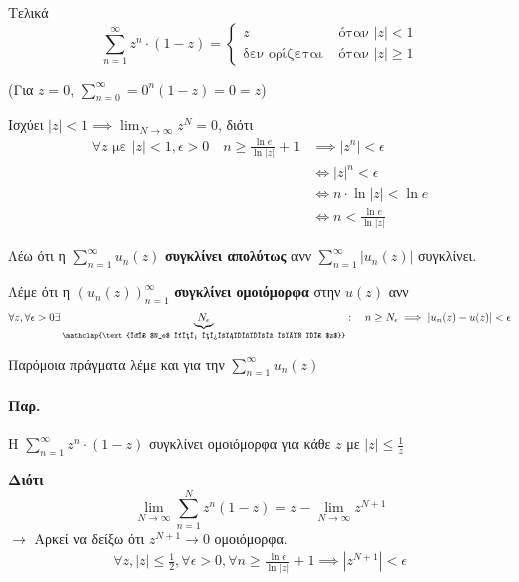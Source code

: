 \documentclass[12pt,a4paper,notitlepage,fleqn]{article}
\begin{document}
     Τελικά \[
     \sum_{n=1}^\infty z^n\cdot(1-z) = \begin{cases}
     z &\text{όταν } |z| < 1 \\
     \text{δεν ορίζεται } &\text{όταν } |z| \geq 1
     \end{cases}
     \]

     (Για \( z=0 \),  \( \sum_{n=0}^\infty = 0^n(1-z) = 0 = z \))

     Ισχύει \(\displaystyle |z|<1 \implies \lim_{N\to \infty} z^N = 0 \),
     διότι
     \begin{align*}
     \forall z \text{ με } |z|<1, \epsilon>0
     \quad n \geq \frac{\ln e}{\ln|z|}+1 &\implies \left|z^n\right| < \epsilon
     \\ &\iff |z|^n < \epsilon
     \\ &\iff n\cdot\ln|z| < \ln e
     \\ &\iff n < \frac{\ln e}{\ln|z|}
     \end{align*}

     \begin{defn*}{}
     	Λέω ότι η \( \displaystyle \sum_{n=1}^\infty u_n(z) \)
     	\textbf{συγκλίνει απολύτως} ανν \(\displaystyle
     	\sum_{n=1}^\infty \left|u_n(z)\right| \) συγκλίνει.
     \end{defn*}

     \begin{defn*}{}
     	Λέμε ότι η \( \displaystyle \left( u_n(z) \right)_{n=1}^\infty \)
     	\textbf{συγκλίνει ομοιόμορφα} στην \( u(z) \) ανν
     	\[
     	\forall z,\forall \epsilon >0 \exists
     	\underbrace{N_\epsilon}_{\mathclap{\text{Το $N_e$ δεν εξαρτάται από το $z$}}}
     	:\quad n \geq N_\epsilon \implies \left|
     	u_n(z)-u(z)
     	\right| < \epsilon
     	\]

     	Παρόμοια πράγματα λέμε και για την \( \displaystyle \boxed{
     		\sum_{n=1}^\infty u_n(z)
     		} \)
     \end{defn*}
     \paragraph{Παρ.}
     Η \( \sum_{n=1}^\infty z^n\cdot(1-z) \) συγκλίνει ομοιόμορφα για κάθε \( z \)
     με \( |z| \leq \frac{1}{z} \)

     \textbf{Διότι}
     \[
     \lim_{N\to \infty}\sum_{n=1}^N z^n(1-z)=z-\lim_{N\to \infty}z^{N+1}
     \]
     \(\rightarrow\) Αρκεί να δείξω ότι \( z^{N+1}\to 0 \) ομοιόμορφα.
     \begin{align*}
     \forall z,|z|\leq\frac{1}{2}, \forall \epsilon>0, \forall n \geq
     \frac{\ln \epsilon}{\ln|z|}+1\implies\left|z^{N+1}\right|<\epsilon
     \end{align*}
\end{document}
